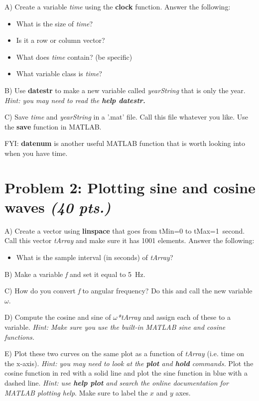 \documentclass[10pt]{article}
\begin{document}
A) Create a variable \textit{time} using the \textbf{clock} function. Answer the following:
\begin{itemize}
	\item What is the size of \textit{time}?
	\item Is it a row or column vector?
	\item What does \textit{time} contain? (be specific)
	\item What variable class is \textit{time}?
\end{itemize}

B) Use \textbf{datestr} to make a new variable called \textit{yearString} that is only the year. \textit{Hint: you may need to read the \textbf{help datestr.}}

C) Save \textit{time} and \textit{yearString} in a '.mat' file. Call this file whatever you like. Use the \textbf{save} function in MATLAB.

FYI: \textbf{datenum} is another useful MATLAB function that is worth looking into when you have time.

\pagebreak
\section*{Problem 2: Plotting sine and cosine waves \textit{(40 pts.)}}

A) Create a vector using \textbf{linspace} that goes from tMin=0 to tMax=1~second. Call this vector \textit{tArray} and make sure it has 1001 elements. Answer the following:
\begin{itemize}
	\item What is the sample interval (in seconds) of \textit{tArray}?
\end{itemize}

B) Make a variable \textit{f} and set it equal to 5~Hz. 

C) How do you convert \textit{f} to angular frequency? Do this and call the new variable $\omega$.

D) Compute the cosine and sine of \textit{$\omega$*tArray} and assign each of these to a variable. \textit{Hint: Make sure you use the built-in MATLAB sine and cosine functions.} 

E) Plot these two curves on the same plot as a function of \textit{tArray} (i.e. time on the x-axis). \textit{Hint: you may need to look at the \textbf{plot} and \textbf{hold} commands.} Plot the cosine function in red with a solid line and plot the sine function in blue with a dashed line. \textit{Hint: use \textbf{help plot} and search the online documentation for MATLAB plotting help}. Make sure to label the $x$ and $y$ axes.
\end{document}
